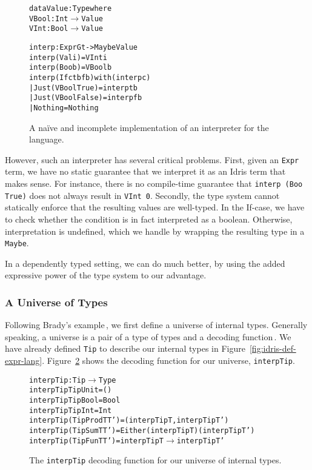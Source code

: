 \begin{figure}
\begin{alltt}
data Value : Type where
  VBool : Int \(\rightarrow\) Value
  VInt  : Bool \(\rightarrow\) Value

interp : Expr G t -> Maybe Value
interp (Val i) = VInt i
interp (Boo b) = VBool b
interp (If c tb fb) with (interp c)
  | Just (VBool True)  = interp tb
  | Just (VBool False) = interp fb
  | Nothing            = Nothing
\end{alltt}
\caption{A na\"{i}ve and incomplete implementation of an interpreter for the language.}
\label{fig:naive-interpreter-impl}
\end{figure}

However, such an interpreter has several critical problems. First, given an \texttt{Expr} term, we have no static guarantee that we interpret it as an Idris term that makes sense. For instance, there is no compile-time guarantee that \texttt{interp (Boo True)} does not always result in \texttt{VInt 0}. Secondly, the type system cannot statically enforce that the resulting values are well-typed. In the If-case, we have to check whether the condition is in fact interpreted as a boolean. Otherwise, interpretation is undefined, which we handle by wrapping the resulting type in a \texttt{Maybe}.

In a dependently typed setting, we can do much better, by using the added expressive power of the type system to our advantage.

\subsubsection{A Universe of Types}
Following Brady's example\,\cite{Brady:IdrisTutorial}, we first define a universe of internal types. Generally speaking, a universe is a pair of a type of types and a decoding function\,\cite{Oury:2008}. We have already defined \texttt{Tip} to describe our internal types in Figure~\ref{fig:idris-def-expr-lang}. Figure~\ref{fig:interpTip} shows the decoding function for our universe, \texttt{interpTip}.

\begin{figure}
\begin{alltt}
interpTip : Tip \(\rightarrow\) Type
interpTip TipUnit        = ()
interpTip TipBool        = Bool
interpTip TipInt         = Int
interpTip (TipProd T T') = (interpTip T, interpTip T')
interpTip (TipSum T T')  = Either (interpTip T) (interpTip T')
interpTip (TipFun T T')  = interpTip T \(\rightarrow\) interpTip T'
\end{alltt}
\caption{The \texttt{interpTip} decoding function for our universe of internal types.}
\label{fig:interpTip}
\end{figure}

